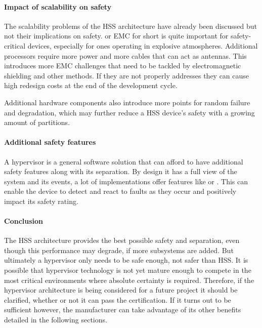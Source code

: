 
\paragraph{Impact of scalability on safety}
The scalability problems of the \gls{HSS} architecture have already been discussed but not their implications on safety.  or \gls{EMC} for short is quite important for safety-critical devices, especially for ones operating in explosive atmospheres. Additional processors require more power and more cables that can act as antennas. This introduces more \gls{EMC} challenges that need to be tackled by electromagnetic shielding and other methods. If they are not properly addresses they can cause high redesign costs at the end of the development cycle.

Additional hardware components also introduce more points for random failure and degradation, which may further reduce a \gls{HSS} device's safety with a growing amount of partitions.

\paragraph{Additional safety features}
A hypervisor is a general software solution that can afford to have additional safety features along with its separation. By design it has a full view of the system and its events, a lot of implementations offer features like  or . This can enable the device to detect and react to faults as they occur and positively impact its safety rating.

\paragraph{Conclusion}
The \gls{HSS} architecture provides the best possible safety and separation, even though this performance may degrade, if more subsystems are added. But ultimately a hypervisor only needs to be safe enough, not safer than \gls{HSS}. It is possible that hypervisor technology is not yet mature enough to compete in the most critical environments where absolute certainty is required. Therefore, if the hypervisor architecture is being considered for a future project it should be clarified, whether or not it can pass the certification. If it turns out to be sufficient however, the manufacturer can take advantage of its other benefits detailed in the following sections.


